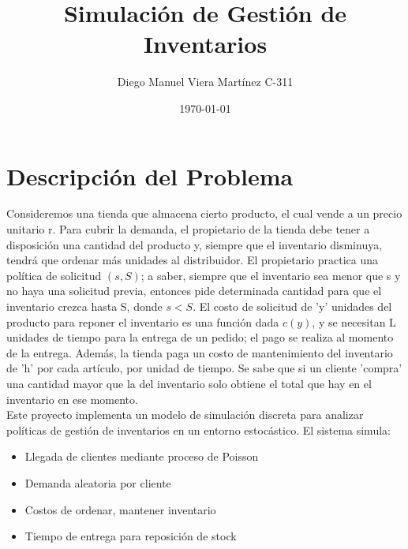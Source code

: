 \documentclass{article}
\title{Simulación de Gestión de Inventarios}
\author{Diego Manuel Viera Martínez C-311}
\date{\today}
\begin{document}
\maketitle
\section{Descripción del Problema}
Consideremos una tienda que almacena cierto producto, el cual vende a un precio unitario r.
Para cubrir la demanda, el propietario de la tienda debe tener a disposición una cantidad del producto
y, siempre que el inventario disminuya, tendrá que ordenar más unidades al distribuidor.
El propietario practica una política de solicitud $(s,S)$; a saber, siempre que el inventario sea
menor que s y no haya una solicitud previa, entonces pide determinada cantidad para que
el inventario crezca hasta S, donde $s < S$. El costo de solicitud de 'y' unidades del producto para reponer el inventario 
es una función dada $c(y)$, y se necesitan L unidades de tiempo para la entrega de un pedido; el pago se realiza al momento de la entrega.
Además, la tienda paga un costo de mantenimiento del inventario de 'h' por cada artículo, por unidad de tiempo. Se sabe que si un cliente
'compra' una cantidad mayor que la del inventario solo obtiene el total que hay en el inventario en ese momento.\\

Este proyecto implementa un modelo de simulación discreta para analizar políticas de gestión de inventarios en un entorno estocástico. El sistema simula:
\begin{itemize}
    \item Llegada de clientes mediante proceso de Poisson
    \item Demanda aleatoria por cliente
    \item Costos de ordenar, mantener inventario
    \item Tiempo de entrega para reposición de stock
\end{itemize}
\end{document}

